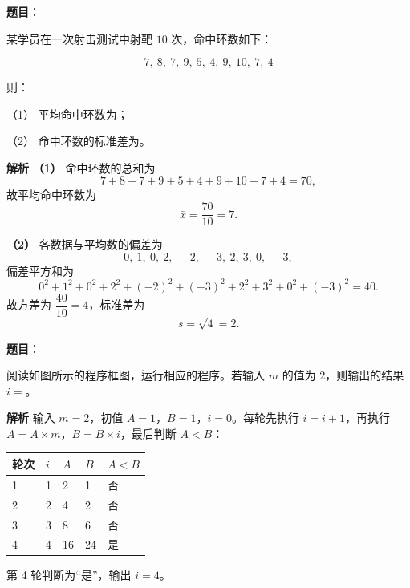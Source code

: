 \begin{answer}

\textbf{题目}：

某学员在一次射击测试中射靶 $10$ 次，命中环数如下：

\nopagebreak[4]
\[7,\ 8,\ 7,\ 9,\ 5,\ 4,\ 9,\ 10,\ 7,\ 4\]

则：

（1） 平均命中环数为\gkblank{}；

（2） 命中环数的标准差为\gkblank{}。

\textbf{解析}
\textbf{（1）} 命中环数的总和为
\nopagebreak[4]
\[7+8+7+9+5+4+9+10+7+4=70,\]
故平均命中环数为
\nopagebreak[4]
\[\bar x=\frac{70}{10}=7.\]

\textbf{（2）} 各数据与平均数的偏差为
\nopagebreak[4]
\[0,\ 1,\ 0,\ 2,\ -2,\ -3,\ 2,\ 3,\ 0,\ -3,\]
偏差平方和为
\nopagebreak[4]
\[0^2+1^2+0^2+2^2+(-2)^2+(-3)^2+2^2+3^2+0^2+(-3)^2=40.\]
故方差为 $\dfrac{40}{10}=4$，标准差为
\nopagebreak[4]
\[s=\sqrt4=2.\]



\end{answer}
\begin{answer}

\textbf{题目}：

阅读如图所示的程序框图，运行相应的程序。若输入 $m$ 的值为 $2$，则输出的结果 $i=$\gkblank{}。
\nopagebreak[4]
\begin{center}\end{center}
\nopagebreak[4]
\textbf{解析}
输入 $m=2$，初值 $A=1$，$B=1$，$i=0$。每轮先执行 $i=i+1$，再执行 $A=A\times m$，$B=B\times i$，最后判断 $A<B$：

\begin{center}
\begin{tabular}{lllll}
\toprule
轮次 & $i$ & $A$ & $B$ & $A<B$ \\
\midrule
1 & 1 & 2 & 1 & 否 \\
2 & 2 & 4 & 2 & 否 \\
3 & 3 & 8 & 6 & 否 \\
4 & 4 & 16 & 24 & 是 \\
\bottomrule
\end{tabular}
\end{center}

第 4 轮判断为“是”，输出 $i=4$。


\end{answer}
